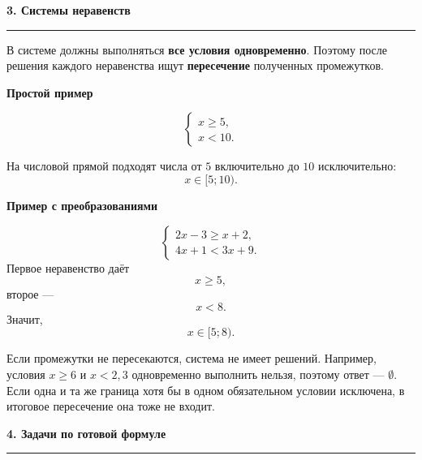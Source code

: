 \documentclass[a4paper,12pt]{article}
\newcommand{\topic}[1]{%
  \Needspace{9\baselineskip}%
  \par\bigskip
  {\Large\bfseries\color{darkaccent}#1}\par
  \vspace{1mm}
  {\color{accent!55}\rule{\linewidth}{0.5pt}}\par
  \medskip
}
\newcommand{\warning}[1]{%
  \par\smallskip
  \noindent{\color{darkaccent}\textbf{Обратите внимание.}} #1\par\smallskip
}
\newcommand{\exampletitle}[1]{%
  \Needspace{8\baselineskip}%
  \par\medskip
  \noindent\textbf{#1}\par\smallskip
}
\begin{document}
\begin{center}
\begin{tikzpicture}[node distance=8mm and 18mm]
\end{tikzpicture}
\end{center}

\clearpage

\topic{3. Системы неравенств}

В системе должны выполняться \textbf{все условия одновременно}. Поэтому после решения каждого неравенства ищут \textbf{пересечение} полученных промежутков.

\exampletitle{Простой пример}
\[
\begin{cases}
x\ge5,\\
x<10.
\end{cases}
\]

На числовой прямой подходят числа от \(5\) включительно до \(10\) исключительно:
\[
\boxed{x\in[5;10)}.
\]

\begin{center}
\end{center}

\exampletitle{Пример с преобразованиями}
\[
\begin{cases}
2x-3\ge x+2,\\
4x+1<3x+9.
\end{cases}
\]
Первое неравенство даёт
\[
x\ge5,
\]
второе ---
\[
x<8.
\]
Значит,
\[
\boxed{x\in[5;8)}.
\]

\warning{Если промежутки не пересекаются, система не имеет решений. Например, условия \(x\ge6\) и \(x<2{,}3\) одновременно выполнить нельзя, поэтому ответ --- \(\emptyset\). Если одна и та же граница хотя бы в одном обязательном условии исключена, в итоговое пересечение она тоже не входит.}

\topic{4. Задачи по готовой формуле}
\end{document}
